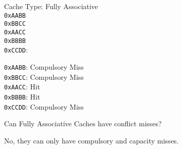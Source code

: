 \begin{blocksection}
Cache Type: Fully Associative
\\
\lstinline$0xAABB$\\
\lstinline$0xBBCC$\\
\lstinline$0xAACC$\\
\lstinline$0xBBBB$\\
\lstinline$0xCCDD$:\\

\begin{solution}[0.7in]
\lstinline$0xAABB$: Compulsory Miss\\
\lstinline$0xBBCC$: Compulsory Miss\\
\lstinline$0xAACC$: Hit\\
\lstinline$0xBBBB$: Hit\\
\lstinline$0xCCDD$: Compulsory Miss\\
\end{solution}
\end{blocksection}
\begin{blocksection}
Can Fully Associative Caches have conflict misses?
\begin{solution}[0.7in]
No, they can only have compulsory and capacity misses.
\end{solution}
\end{blocksection}
